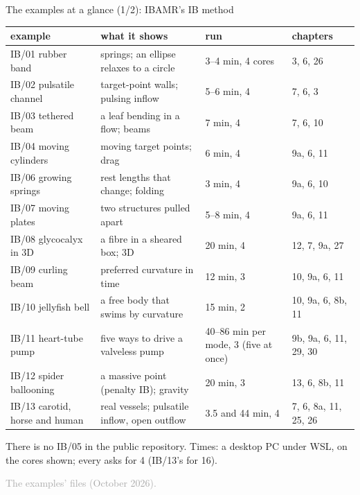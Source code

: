 \documentclass[aspectratio=169,11pt]{beamer}
\newcommand{\sourcecredit}[1]{\vfill\begin{flushright}\tiny\textcolor{DarkGray}{#1}\end{flushright}}
\begin{document}
\begin{frame}{The examples at a glance (1/2): IBAMR's IB method}
\label{fr:glance1}
\scriptsize
\renewcommand{\arraystretch}{0.95}
\begin{tabular}{@{}L{0.24\textwidth}L{0.40\textwidth}L{0.10\textwidth}L{0.16\textwidth}@{}}
\toprule
example & what it shows & run & chapters \\
\midrule
IB/01 rubber band & springs; an ellipse relaxes to a circle & 3--4 min, 4 cores & 3, 6, 26 \\
IB/02 pulsatile channel & target-point walls; pulsing inflow & 5--6 min, 4 & 7, 6, 3 \\
IB/03 tethered beam & a leaf bending in a flow; beams & 7 min, 4 & 7, 6, 10 \\
IB/04 moving cylinders & moving target points; drag & 6 min, 4 & 9a, 6, 11 \\
IB/06 growing springs & rest lengths that change; folding & 3 min, 4 & 9a, 6, 10 \\
IB/07 moving plates & two structures pulled apart & 5--8 min, 4 & 9a, 6, 11 \\
IB/08 glycocalyx in 3D & a fibre in a sheared box; 3D & 20 min, 4 & 12, 7, 9a, 27 \\
IB/09 curling beam & preferred curvature in time & 12 min, 3 & 10, 9a, 6, 11 \\
IB/10 jellyfish bell & a free body that swims by curvature & 15 min, 2 & 10, 9a, 6, 8b, 11 \\
IB/11 heart-tube pump & five ways to drive a valveless pump & 40--86 min per mode, 3 (five at once) & 9b, 9a, 6, 11, 29, 30 \\
IB/12 spider ballooning & a massive point (penalty IB); gravity & 20 min, 3 & 13, 6, 8b, 11 \\
IB/13 carotid, horse and human & real vessels; pulsatile inflow, open outflow & 3.5 and 44 min, 4 & 7, 6, 8a, 11, 25, 26 \\
\bottomrule
\end{tabular}

\vspace{1mm}
\footnotesize There is no IB/05 in the public repository. Times: a desktop PC under WSL, on the cores shown; every  asks for 4 (IB/13's for 16).
\sourcecredit{The examples'  files (October 2026).}
\end{frame}
\end{document}
